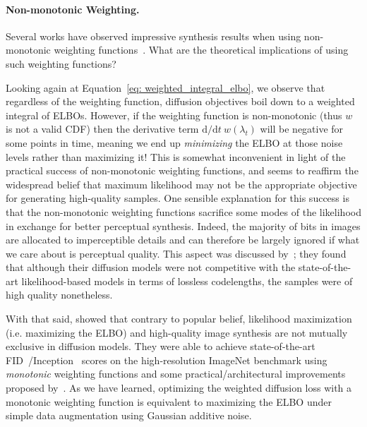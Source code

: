 \paragraph{Non-monotonic Weighting.} Several works have observed impressive synthesis results when using non-monotonic weighting functions~\citep{nichol2021improved,karras2022elucidating,choi2022perception,hang2023efficient}. What are the theoretical implications of using such weighting functions? 

Looking again at Equation~\ref{eq: weighted_integral_elbo}, we observe that regardless of the weighting function, diffusion objectives boil down to a weighted integral of ELBOs. However, if the weighting function is non-monotonic (thus $w$ is not a valid CDF) then the derivative term $\mathrm{d}/\mathrm{d}t \ w(\lambda_t)$ will be negative for some points in time, meaning we end up \textit{minimizing} the ELBO at those noise levels rather than maximizing it! This is somewhat inconvenient in light of the practical success of non-monotonic weighting functions, and seems to reaffirm the widespread belief that maximum likelihood may not be the appropriate objective for generating high-quality samples. One sensible explanation for this success is that the non-monotonic weighting functions sacrifice some modes of the likelihood in exchange for better perceptual synthesis. Indeed, the majority of bits in images are allocated to imperceptible details and can therefore be largely ignored if what we care about is perceptual quality. This aspect was discussed by~\cite{ho2020denoising}; they found that although their diffusion models were not competitive with the state-of-the-art likelihood-based models in terms of lossless codelengths, the samples were of high quality nonetheless.

With that said, \cite{kingma2023understanding} showed that contrary to popular belief, likelihood maximization (i.e. maximizing the ELBO) and high-quality image synthesis are not mutually exclusive in diffusion models. They were able to achieve state-of-the-art FID~\citep{heusel2017gans}/Inception~\citep{salimans2016improved} scores on the high-resolution ImageNet benchmark using \textit{monotonic} weighting functions and some practical/architectural improvements proposed by~\cite{pmlr-v202-hoogeboom23a}. As we have learned, optimizing the weighted diffusion loss with a monotonic weighting function is equivalent to maximizing the ELBO under simple data augmentation using Gaussian additive noise.